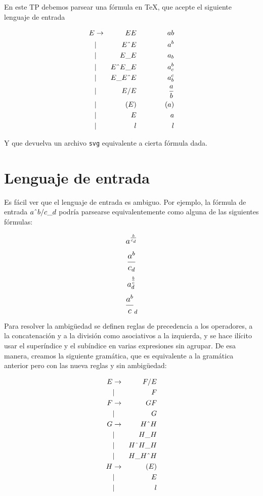 \documentclass[a4paper, 10pt, twoside]{article}
\begin{document}
En este TP debemos parsear una f\'ormula en TeX, que acepte el siguiente lenguaje de entrada

\[
\begin{aligned}
E & \rightarrow & E E & \hspace{3em} & ab \\
& | & E \string^ E & & a^b \\
& | & E \_ E & & a_b \\
& | & E \string^ E \_ E & & a^b_c \\
& | & E \_ E \string^ E & & a_b^c \\
& | & E / E & & \frac{a}{b} \\
& | & ( E ) & & (a) \\
& | & { E } & & a \\
& | & l & & l
\end{aligned}
\]

Y que devuelva un archivo \texttt{svg} equivalente a cierta f\'ormula dada.

\section{Lenguaje de entrada}

Es f\'acil ver que el lenguaje de entrada es ambiguo. Por ejemplo, la f\'ormula de entrada \(a \string^ b / c \_ d\) podr\'ia parsearse equivalentemente como alguna de las siguientes f\'ormulas:

\begin{multicols}{4}
\[ \mathlarger{ a^{\frac{b}{c_d}} } \] \break
\[ \mathlarger{ \frac{a^b}{c_d} } \] \break
\[ \mathlarger{ a^{\frac{b}{c}}_d } \] \break
\[ \mathlarger{ \frac{a^b}{c}_d } \]
\end{multicols}

Para resolver la ambig\"uedad se definen reglas de precedencia a los operadores, a la concatenaci\'on y a la divisi\'on como asociativos a la izquierda, y se hace il\'icito usar el super\'indice y el sub\'indice en varias expresiones sin agrupar. De esa manera, creamos la siguiente gram\'atica, que es equivalente a la gram\'atica anterior pero con las nueva reglas y sin ambig\"uedad:

\[
\begin{aligned}
E & \rightarrow & F / E \\
& | & F \\
F & \rightarrow & G F \\
& | & G \\
G & \rightarrow & H \string^ H \\
& | & H \_ H \\
& | & H \string^ H \_ H \\
& | & H \_ H \string^ H \\
H & \rightarrow & ( E ) \\
& | & { E } \\
& | & l
\end{aligned}
\]
\end{document}
